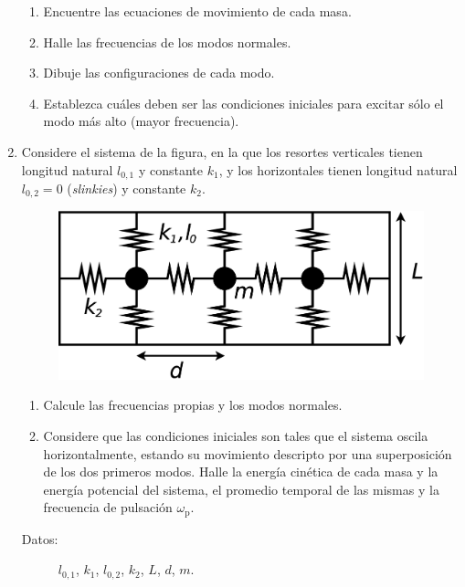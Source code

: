 \documentclass[11pt,spanish]{article}
\begin{document}
\begin{enumerate}
    \begin{enumerate}
        \item Encuentre las ecuaciones de movimiento de cada masa. 
        \item Halle las frecuencias de los modos normales. 
        \item Dibuje las configuraciones de cada modo. 
        \item Establezca cuáles deben ser las condiciones iniciales para excitar
        sólo el modo más alto (mayor frecuencia).
    \end{enumerate}


    \item Considere el sistema de la figura, en la que los resortes verticales
    tienen longitud natural $l_{0,1}$ y constante $k_{1}$, y los horizontales tienen longitud natural $l_{0,2}=0$ (\textit{slinkies}) y constante $k_{2}$.

    \begin{figure}[H]
        \centering{}\includegraphics[clip,scale=0.25]{figs/ej1-10}
    \end{figure}

    \begin{enumerate}
        \item Calcule las frecuencias propias y los modos normales.

        \item Considere que las condiciones iniciales son tales que el sistema
        oscila horizontalmente, estando su movimiento descripto por una
        superposición de los dos primeros modos. Halle la energía cinética de
        cada masa y la energía potencial del sistema, el promedio temporal de
        las mismas y la frecuencia de pulsación $\omega_\text{p}$.
    \end{enumerate}

    \begin{description}
        \item [{Datos:}] $l_{0,1}$, $k_{1}$, $l_{0,2}$, $k_{2}$, $L$, $d$,
    $m$.
    \end{description}



\end{enumerate}
\end{document}

